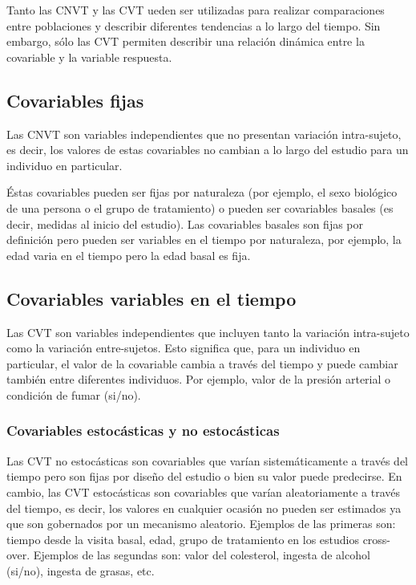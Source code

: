 \documentclass[spanish]{article}
\numberwithin{figure}{subsection}
\numberwithin{equation}{subsection}
\numberwithin{table}{subsection}
\begin{document}
Tanto las CNVT y las CVT ueden ser utilizadas para realizar comparaciones entre
poblaciones y describir diferentes tendencias a lo largo del tiempo. Sin
embargo, sólo las CVT permiten describir una relación dinámica entre la
covariable y la variable respuesta.

\subsection{Covariables fijas}

Las CNVT son variables independientes que no presentan variación intra-sujeto,
es decir, los valores de estas covariables no cambian a lo largo del estudio
para un individuo en particular.

Éstas covariables pueden ser fijas por naturaleza (por ejemplo, el sexo
biológico de una persona o el grupo de tratamiento) o pueden ser covariables
basales (es decir, medidas al inicio del estudio). Las covariables basales son
fijas por definición pero pueden ser variables en el tiempo por naturaleza, por
ejemplo, la edad varia en el tiempo pero la edad basal es fija.

\subsection{Covariables variables en el tiempo}

Las CVT son variables independientes que incluyen tanto la variación
intra-sujeto como la variación entre-sujetos. Esto significa que, para un
individuo en particular, el valor de la covariable cambia a través del tiempo y
puede cambiar también entre diferentes individuos. Por ejemplo, valor de la
presión arterial o condición de fumar (si/no).

\subsubsection{Covariables estocásticas y no estocásticas}

Las CVT no estocásticas son covariables que varían sistemáticamente a través
del tiempo pero son fijas por diseño del estudio o bien su valor puede
predecirse. En cambio, las CVT estocásticas son covariables que varían
aleatoriamente a través del tiempo, es decir, los valores en cualquier ocasión
no pueden ser estimados ya que son gobernados por un mecanismo aleatorio.
Ejemplos de las primeras son: tiempo desde la visita basal, edad, grupo de
tratamiento en los estudios cross-over. Ejemplos de las segundas son: valor del
colesterol, ingesta de alcohol (si/no), ingesta de grasas, etc.
\end{document}
